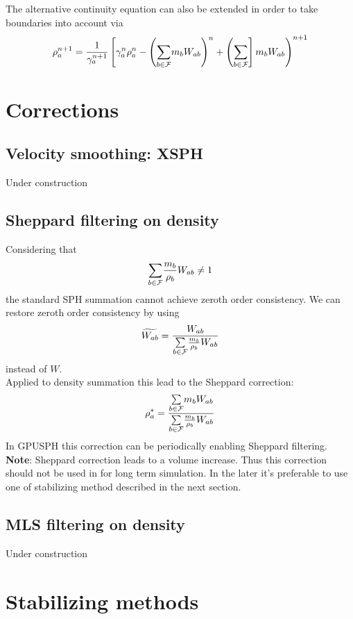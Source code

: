\documentclass{../GPUSPHtemplate}
\begin{document}
The alternative continuity equation can also be extended in order to
take boundaries into account via
\begin{equation}
\rho_a^{n+1} = \frac{1}{\gamma_a^{n+1}}\left[\gamma_a^n \rho_a^n - \left(\underset{b \in \mathcal{F}}{\sum} m_b
W_{ab}\right)^n + \left(\underset{b \in \mathcal{F}}{\sum}\right]
m_b W_{ab}\right)^{n+1}
\label{e:sa:sumrho-time}
\end{equation}

\section{Corrections}
\subsection{Velocity smoothing: XSPH}
Under construction

\subsection{Sheppard filtering on density}
Considering that 
\begin{equation*}
\underset{b \in \mathcal{F}}{\sum} \frac{m_b}{\rho_b} W_{ab} \neq 1
\end{equation*}
the standard SPH summation cannot achieve zeroth order consistency. We can restore zeroth
order consistency by using 
\begin{equation*}
\widetilde{W_{ab}}=\frac{W_{ab}}{\underset{b \in \mathcal{F}}{\sum}  \frac{m_b}{\rho_b} W_{ab}}
\end{equation*}
instead of $W$.\\
Applied to density summation this lead to the Sheppard correction:
\begin{equation}
{\rho}_a^*=\frac{\underset{b \in \mathcal{F}}{\sum} m_b W_{ab}}{\underset{b \in \mathcal{F}}{\sum}  \frac{m_b}{\rho_b} W_{ab}}
\end{equation}
\label{e:corr:sheppard}
In GPUSPH this correction can be periodically enabling Sheppard filtering.
\textbf{Note}: Sheppard correction leads to a volume increase. Thus this correction should not be used in
for long term simulation. In the later it's preferable to use one of stabilizing method described in the next
section.

\subsection{MLS filtering on density}
Under construction

\section{Stabilizing methods}
\end{document}

